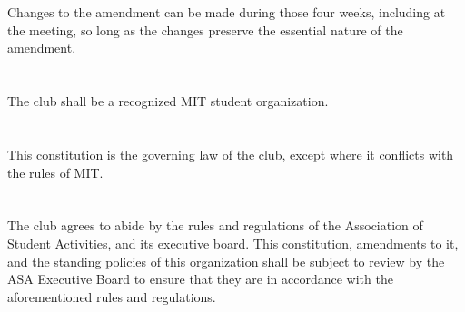 \documentclass{bylaws}
\begin{document}
\section{}Changes to the amendment can be made during those four weeks, including at the meeting, so long as the changes preserve the essential nature of the amendment.


\section{}The club shall be a recognized MIT student organization.
\section{}This constitution is the governing law of the club, except where it
conflicts with the rules of MIT.
\section{}The club agrees to abide by the rules and regulations of the
Association of Student Activities, and its executive board. This
constitution, amendments to it, and the standing policies of this organization
shall be subject to review by the ASA Executive Board to ensure that
they are in accordance with the aforementioned rules and regulations.
\end{document}

